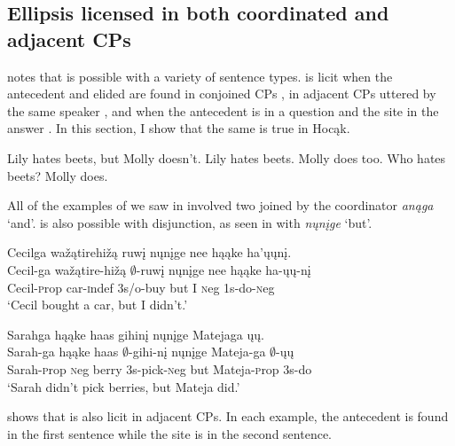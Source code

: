\documentclass[output=paper]{LSP/langsci}
\begin{document}
\subsection{Ellipsis licensed in both coordinated and adjacent CPs}\label{sec:johnson:3.1}

\citet{Goldberg2005} notes that   is possible with a variety of sentence types.  is licit when the antecedent  and elided  are found in conjoined CPs , in adjacent CPs uttered by the same speaker , and when the antecedent is in a question and the  site in the answer . In this section, I show that the same is true in Hocąk.
 
\ea\label{ex:johnson:25}
\ea\label{ex:johnson:25a}
Lily hates beets, but Molly doesn't.
\ex\label{ex:johnson:25b}
Lily hates beets. Molly does too.
\ex\label{ex:johnson:25c} 
Who hates beets? Molly does.
\z
\z

All of the examples of  we saw in  involved two  joined by the coordinator \emph{anąga} `and'.  is also possible with disjunction, as seen in  with \emph{nųnįge} `but'.
 
\ea\label{ex:johnson:26}
\ea 
\glll Cecilga wažątirehižą ruwį nųnįge nee hąąke ha'ųųnį.\\
Cecil-ga wažątire-hižą $\emptyset$-ruwį nųnįge nee hąąke ha-ųų-nį\\
Cecil-{\textsc prop} car-{\textsc indef} {\textsc 3s/o}-buy but I {\textsc neg} {\textsc 1s}-do-{\textsc neg}\\
\trans `Cecil bought a car, but I didn't.'

\ex 
\glll Sarahga hąąke haas gihinį nųnįge Matejaga ųų.\\
Sarah-ga hąąke haas $\emptyset$-gihi-nį nųnįge Mateja-ga $\emptyset$-ųų\\
Sarah-{\textsc prop} {\textsc neg} berry {\textsc 3s}-pick-{\textsc neg} but Mateja-{\textsc prop} {\textsc 3s}-do\\
\trans `Sarah didn't pick berries, but Mateja did.'
\z
\z


 shows that  is also licit in adjacent CPs. In each example, the antecedent  is found in the first sentence while the  site is in the second sentence.
 
\end{document}
